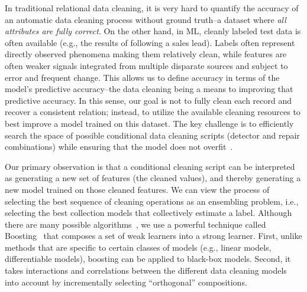 In traditional relational data cleaning, it is very hard to quantify the accuracy of an automatic data cleaning process without ground truth--a dataset where {\it all attributes are fully correct}.
On the other hand, in ML, cleanly labeled test data is often available (e.g., the results of following a sales lead). 
Labels often represent directly observed phenomena making them relatively clean, while features are often weaker signals integrated from multiple disparate sources and subject to error and frequent change.
This allows us to define accuracy in terms of the model's predictive accuracy--the data cleaning being a means to improving that predictive accuracy.
In this sense, our goal is not to fully clean each record and recover a consistent relation; instead, to utilize the available cleaning resources to best improve a model trained on this dataset.
The key challenge is to efficiently search the space of possible conditional data cleaning scripts (detector and repair combinations) while ensuring that the model does not overfit~\cite{DBLP:journals/pvldb/KrishnanWWFG16,krishnan2016hilda}.   

Our primary observation is that a conditional cleaning script can be interpreted as generating a new set of features (the cleaned values), and thereby generating a new model trained on those cleaned features. 
We can view the process of selecting the best sequence of cleaning operations as an ensembling problem, i.e., selecting the best collection models that collectively estimate a label. 
Although there are many possible algorithms~\cite{dietterich2000ensemble}, we use a powerful technique called Boosting~\cite{freund1995desicion} that composes a set of weak learners into a strong learner.  
First, unlike methods that are specific to certain classes of models (e.g., linear models, differentiable models), boosting can be applied to black-box models. 
Second, it takes interactions and correlations between the different data cleaning models into account by incrementally selecting ``orthogonal'' compositions.


